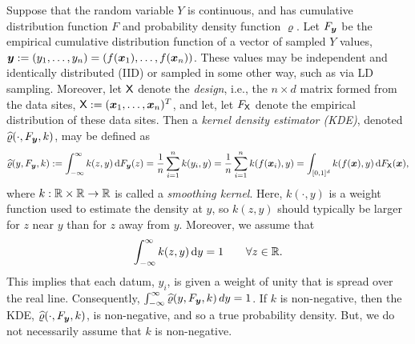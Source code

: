 \documentclass[letterpaper]{amsart}
\newcommand{\hvarrho}{\widehat{\varrho}}
\begin{document}
Suppose that  the random variable $Y$ is continuous, and has cumulative distribution function $F$ and probability density function $\varrho$.  Let $F_{\boldsymbol{y}}$ be the empirical cumulative distribution function of a vector of sampled $Y$ values, $\boldsymbol{y} := (y_1, \ldots, y_n) = (f(\boldsymbol{x}_1), \ldots, f(\boldsymbol{x}_n))$.  These values may be independent and identically distributed (IID) or sampled in some other way, such as via LD sampling.  Moreover, let $\mathsf{X}$ denote the \emph{design}, i.e., the $n \times d$ matrix formed from the data sites, $\mathsf{X}:=(\boldsymbol{x}_1, \ldots, \boldsymbol{x}_n)^T$, and let, let $F_{\mathsf{X}}$ denote the empirical distribution of  these data sites.  Then a \emph{kernel density estimator (KDE)}, denoted $\hvarrho(\cdot,F_{\vy},k)$, may be defined  as
\begin{equation} \label{eq:kdedef}
	\hvarrho(y,F_{\vy},k) := \int_{-\infty}^{\infty} k(z,y) \, \dif F_{\vy}(z)  = \frac 1n \sum_{i=1}^n k(y_i,y) \\
	= \frac 1n \sum_{i=1}^n k(f(\vx_i),y) = \int_{[0,1]^d} k(f(\vx),y) \, \dif F_\mX(\vx),
\end{equation}
where $k:\mathbb{R} \times \mathbb{R} \to \mathbb{R}$ is called a \emph{smoothing kernel}.  Here, $k(\cdot,y)$ is a weight function used to estimate the density at $y$, so $k(z,y)$ should typically be larger for $z$ near $y$ than for $z$ away from $y$.   Moreover, we assume that
\begin{equation}
	\label{eq:kintegral}
	\int_{-\infty}^{\infty} k(z,y) \, {\rm d} y = 1 \qquad \forall z \in \mathbb{R}.
\end{equation}
This implies that each datum, $y_i$, is given a weight of unity that is spread over the real line.  Consequently, $\int_{-\infty}^{\infty} \hvarrho(y,F_{\vy},k) \, dy = 1$.  If $k$ is non-negative, then the KDE, $\hvarrho(\cdot,F_{\vy},k)$, is non-negative, and so a true probability density.  But, we do not necessarily assume that $k$ is non-negative.
\end{document}
